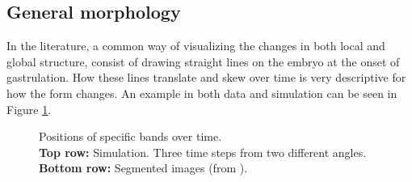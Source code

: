 \subsection{General morphology}
In the literature, a common way of visualizing the changes in both local and global structure, consist of drawing straight lines on the embryo at the onset of gastrulation. How these lines translate and skew over time is very descriptive for how the form changes. An example in both data and simulation can be seen in Figure \ref{fig:band-movements-stas}.

\begin{figure}[H]
    \centering
\end{figure}
\begin{figure}[H]
    \centering
    \caption{Positions of specific bands over time. \\ \textbf{Top row:} Simulation. Three time steps from two different angles.\\ \textbf{Bottom row:}  Segmented images (from ). \\}
    \label{fig:band-movements-stas}
\end{figure}


